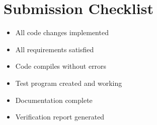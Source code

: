 \documentclass[11pt,a4paper]{article}
\begin{document}
\section*{Submission Checklist}

\begin{itemize}
    \item[\textcolor{green!70!black}{$\checkmark$}] All code changes implemented
    \item[\textcolor{green!70!black}{$\checkmark$}] All requirements satisfied
    \item[\textcolor{green!70!black}{$\checkmark$}] Code compiles without errors
    \item[\textcolor{green!70!black}{$\checkmark$}] Test program created and working
    \item[\textcolor{green!70!black}{$\checkmark$}] Documentation complete
    \item[\textcolor{green!70!black}{$\checkmark$}] Verification report generated
\end{itemize}
\end{document}
